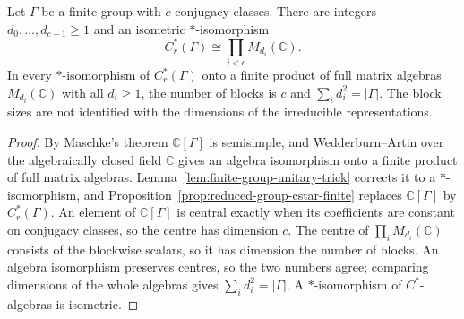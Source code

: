 \begin{proposition}\label{prop:reduced-group-cstar-finite-matrix}
\leanok
{}
Let $\Gamma$ be a finite group with $c$ conjugacy classes. There are integers
$d_0,\dots,d_{c-1}\ge1$ and an isometric $*$-isomorphism
\[
 C_r^*(\Gamma)\cong\prod_{i<c}M_{d_i}(\mathbb C).
\]
In every $*$-isomorphism of $C_r^*(\Gamma)$ onto a finite product of full
matrix algebras $M_{d_i}(\mathbb C)$ with all $d_i\ge1$, the number of blocks
is $c$ and $\sum_i d_i^2=|\Gamma|$. The block sizes are not identified with the
dimensions of the irreducible representations.
\end{proposition}
\begin{proof}
\leanok
By Maschke's theorem $\mathbb C[\Gamma]$ is semisimple, and Wedderburn--Artin
over the algebraically closed field $\mathbb C$ gives an algebra isomorphism
onto a finite product of full matrix algebras. Lemma~\ref{lem:finite-group-unitary-trick}
corrects it to a $*$-isomorphism, and Proposition~\ref{prop:reduced-group-cstar-finite}
replaces $\mathbb C[\Gamma]$ by $C_r^*(\Gamma)$. An element of $\mathbb C[\Gamma]$
is central exactly when its coefficients are constant on conjugacy classes, so
the centre has dimension $c$. The centre of $\prod_i M_{d_i}(\mathbb C)$ consists
of the blockwise scalars, so it has dimension the number of blocks. An algebra
isomorphism preserves centres, so the two numbers agree; comparing dimensions of
the whole algebras gives $\sum_i d_i^2=|\Gamma|$. A $*$-isomorphism of
$C^*$-algebras is isometric.
\end{proof}

